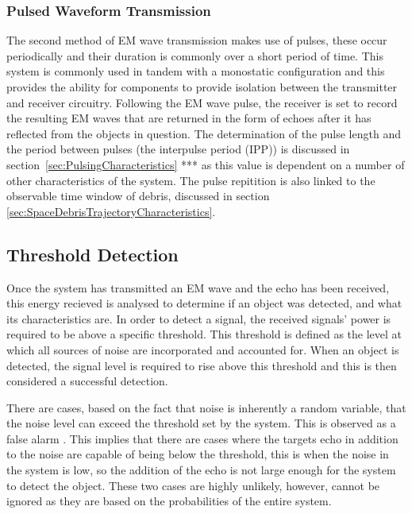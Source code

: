 \documentclass[11pt]{witseiepaper}
\begin{document}
\subsubsection{Pulsed Waveform Transmission} \label{sec:PulsedWaveformTransmission}

The second method of EM wave transmission makes use of pulses, these occur periodically and their duration is commonly over a short period of time. This system is commonly used in tandem with a monostatic configuration and this provides the ability for components to provide isolation between the transmitter and receiver circuitry.
Following the EM wave pulse, the receiver is set to record the resulting EM waves that are returned in the form of echoes after it has reflected from the objects in question. The determination of the pulse length and the period between pulses (the interpulse period (IPP)) is discussed in section~\ref{sec:PulsingCharacteristics} *** as this value is dependent on a number of other characteristics of the system. The pulse repitition is also linked to the observable time window of debris, discussed in section \ref{sec:SpaceDebrisTrajectoryCharacteristics}.


\subsection{Threshold Detection} \label{sec:ThresholdDetection}
Once the system has transmitted an EM wave and the echo has been received, this energy recieved is analysed to determine if an object was detected, and what its characteristics are.
In order to detect a signal, the received signals' power is required to be above a specific threshold. This threshold is defined as the level at which all sources of noise are incorporated and accounted for. When an object is detected, the signal level is required to rise above this threshold and this is then considered a successful detection.

There are cases, based on the fact that noise is inherently a random variable, that the noise level can exceed the threshold set by the system. This is observed as a false alarm \cite[Ch~.3]{radarHandbook}.
This implies that there are cases where the targets echo in addition to the noise are capable of being below the threshold, this is when the noise in the system is low, so the addition of the echo is not large enough for the system to detect the object.
These two cases are highly unlikely, however, cannot be ignored as they are based on the probabilities of the entire system.
\end{document}
